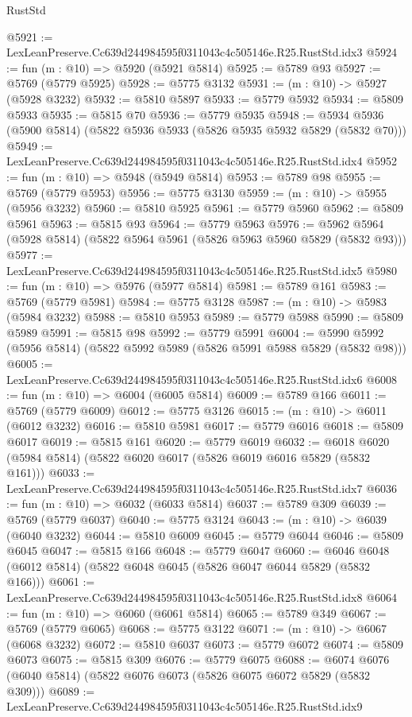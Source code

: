\begin{lexlean}{RustStd}
\begin{coremodule}
@5921 := LexLeanPreserve.Cc639d244984595f0311043c4c505146e.R25.RustStd.idx3
@5924 := fun (m : @10) => @5920 (@5921 @5814)
@5925 := @5789 @93
@5927 := @5769 (@5779 @5925)
@5928 := @5775 @3132
@5931 := (m : @10) -> @5927 (@5928 @3232)
@5932 := @5810 @5897
@5933 := @5779 @5932
@5934 := @5809 @5933
@5935 := @5815 @70
@5936 := @5779 @5935
@5948 := @5934 @5936 (@5900 @5814) (@5822 @5936 @5933 (@5826 @5935 @5932 @5829 (@5832 @70)))
@5949 := LexLeanPreserve.Cc639d244984595f0311043c4c505146e.R25.RustStd.idx4
@5952 := fun (m : @10) => @5948 (@5949 @5814)
@5953 := @5789 @98
@5955 := @5769 (@5779 @5953)
@5956 := @5775 @3130
@5959 := (m : @10) -> @5955 (@5956 @3232)
@5960 := @5810 @5925
@5961 := @5779 @5960
@5962 := @5809 @5961
@5963 := @5815 @93
@5964 := @5779 @5963
@5976 := @5962 @5964 (@5928 @5814) (@5822 @5964 @5961 (@5826 @5963 @5960 @5829 (@5832 @93)))
@5977 := LexLeanPreserve.Cc639d244984595f0311043c4c505146e.R25.RustStd.idx5
@5980 := fun (m : @10) => @5976 (@5977 @5814)
@5981 := @5789 @161
@5983 := @5769 (@5779 @5981)
@5984 := @5775 @3128
@5987 := (m : @10) -> @5983 (@5984 @3232)
@5988 := @5810 @5953
@5989 := @5779 @5988
@5990 := @5809 @5989
@5991 := @5815 @98
@5992 := @5779 @5991
@6004 := @5990 @5992 (@5956 @5814) (@5822 @5992 @5989 (@5826 @5991 @5988 @5829 (@5832 @98)))
@6005 := LexLeanPreserve.Cc639d244984595f0311043c4c505146e.R25.RustStd.idx6
@6008 := fun (m : @10) => @6004 (@6005 @5814)
@6009 := @5789 @166
@6011 := @5769 (@5779 @6009)
@6012 := @5775 @3126
@6015 := (m : @10) -> @6011 (@6012 @3232)
@6016 := @5810 @5981
@6017 := @5779 @6016
@6018 := @5809 @6017
@6019 := @5815 @161
@6020 := @5779 @6019
@6032 := @6018 @6020 (@5984 @5814) (@5822 @6020 @6017 (@5826 @6019 @6016 @5829 (@5832 @161)))
@6033 := LexLeanPreserve.Cc639d244984595f0311043c4c505146e.R25.RustStd.idx7
@6036 := fun (m : @10) => @6032 (@6033 @5814)
@6037 := @5789 @309
@6039 := @5769 (@5779 @6037)
@6040 := @5775 @3124
@6043 := (m : @10) -> @6039 (@6040 @3232)
@6044 := @5810 @6009
@6045 := @5779 @6044
@6046 := @5809 @6045
@6047 := @5815 @166
@6048 := @5779 @6047
@6060 := @6046 @6048 (@6012 @5814) (@5822 @6048 @6045 (@5826 @6047 @6044 @5829 (@5832 @166)))
@6061 := LexLeanPreserve.Cc639d244984595f0311043c4c505146e.R25.RustStd.idx8
@6064 := fun (m : @10) => @6060 (@6061 @5814)
@6065 := @5789 @349
@6067 := @5769 (@5779 @6065)
@6068 := @5775 @3122
@6071 := (m : @10) -> @6067 (@6068 @3232)
@6072 := @5810 @6037
@6073 := @5779 @6072
@6074 := @5809 @6073
@6075 := @5815 @309
@6076 := @5779 @6075
@6088 := @6074 @6076 (@6040 @5814) (@5822 @6076 @6073 (@5826 @6075 @6072 @5829 (@5832 @309)))
@6089 := LexLeanPreserve.Cc639d244984595f0311043c4c505146e.R25.RustStd.idx9

\end{coremodule}
\end{lexlean}
